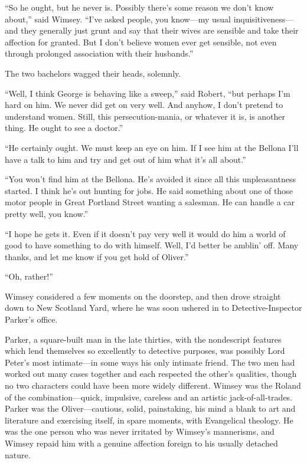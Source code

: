 \enquote{So he ought, but he never is. Possibly there's some reason we don't know about,} said Wimsey. \enquote{I've asked people, you know\allowbreak---\allowbreak my usual inquisitiveness\allowbreak---\allowbreak and they generally just grunt and say that their wives are sensible and take their affection for granted. But I don't believe women ever get sensible, not even through prolonged association with their husbands.}

The two bachelors wagged their heads, solemnly.

\enquote{Well, I think George is behaving like a sweep,} said Robert, \enquote{but perhaps I'm hard on him. We never did get on very well. And anyhow, I don't pretend to understand women. Still, this persecution-mania, or whatever it is, is another thing. He ought to see a doctor.}

\enquote{He certainly ought. We must keep an eye on him. If I see him at the Bellona I'll have a talk to him and try and get out of him what it's all about.}

\enquote{You won't find him at the Bellona. He's avoided it since all this unpleasantness started. I think he's out hunting for jobs. He said something about one of those motor people in Great Portland Street wanting a salesman. He can handle a car pretty well, you know.}

\enquote{I hope he gets it. Even if it doesn't pay very well it would do him a world of good to have something to do with himself. Well, I'd better be amblin' off. Many thanks, and let me know if you get hold of Oliver.}

\enquote{Oh, rather!}

Wimsey considered a few moments on the doorstep, and then drove straight down to New Scotland Yard, where he was soon ushered in to Detective-Inspector Parker's office.

Parker, a square-built man in the late thirties, with the nondescript features which lend themselves so excellently to detective purposes, was possibly Lord Peter's most intimate\allowbreak---\allowbreak in some ways his only intimate friend. The two men had worked out many cases together and each respected the other's qualities, though no two characters could have been more widely different. Wimsey was the Roland of the combination\allowbreak---\allowbreak quick, impulsive, careless and an artistic jack-of-all-trades. Parker was the Oliver\allowbreak---\allowbreak cautious, solid, painstaking, his mind a blank to art and literature and exercising itself, in spare moments, with Evangelical theology. He was the one person who was never irritated by Wimsey's mannerisms, and Wimsey repaid him with a genuine affection foreign to his usually detached nature.

